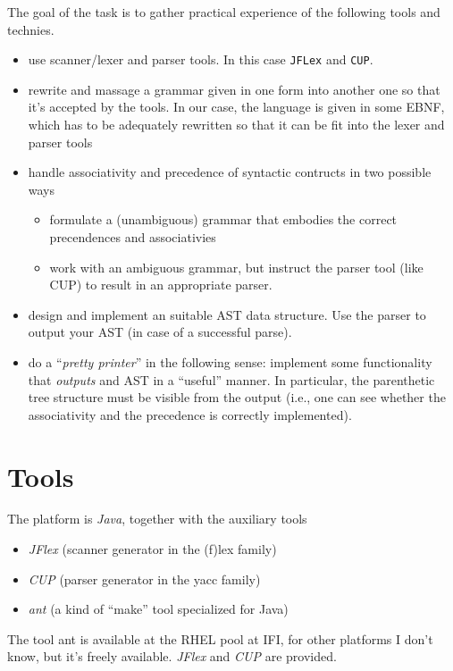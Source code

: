\documentclass[10pt,freeform]{handout}[2014/08/13]
\begin{document}
The goal of the task is to gather practical experience of the following
tools and technies.
\begin{itemize}
\item use scanner/lexer and parser tools. In this case \texttt{JFLex} and
  \texttt{CUP}.
\item rewrite and massage a grammar given in one form into another one so
  that it's accepted by the tools. In our case, the language is given in
  some EBNF, which has to be adequately rewritten so that it can be fit
  into the lexer and parser tools
\item handle associativity and precedence of syntactic contructs in two
  possible ways
  \begin{itemize}
  \item formulate a (unambiguous) grammar that embodies the correct
    precendences and associativies
  \item work with an ambiguous grammar, but instruct the parser tool (like
    CUP) to result in an appropriate parser.
  \end{itemize}
\item design and implement an suitable AST data structure.  Use the parser
  to output your AST (in case of a successful parse).
\item do a ``\emph{pretty printer}'' in the following sense: implement some
  functionality that \emph{outputs} and AST in a ``useful'' manner. In
  particular, the parenthetic tree structure must be visible from the
  output (i.e., one can see whether the associativity and the precedence is
  correctly implemented). 
\end{itemize}


\section{Tools}

The platform is \emph{Java}, together with the auxiliary tools

\begin{itemize}
\item \textsl{JFlex} (scanner generator in the (f)lex family)
\item \textsl{CUP} (parser generator in the yacc family)
\item \textsl{ant} (a kind of ``make'' tool specialized for Java)
\end{itemize}


The tool ant is available at the RHEL pool at IFI, for other platforms I
don't know, but it's freely available. \textsl{JFlex} and \textsl{CUP} are
provided.
\end{document}
